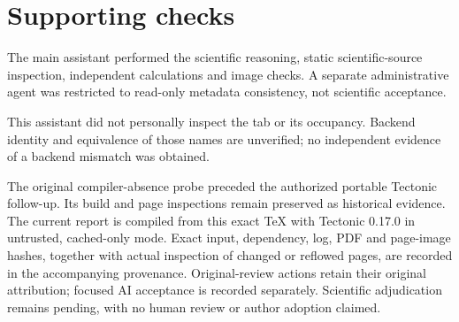 \documentclass[10pt]{article}
\begin{document}
\section*{Supporting checks}
The main assistant performed the scientific reasoning, static scientific-source inspection, independent calculations and image checks. A separate administrative agent was restricted to read-only metadata consistency, not scientific acceptance.\par
This assistant did not personally inspect the tab or its occupancy. Backend identity and equivalence of those names are unverified; no independent evidence of a backend mismatch was obtained.\par
The original compiler-absence probe preceded the authorized portable Tectonic follow-up. Its build and page inspections remain preserved as historical evidence. The current report is compiled from this exact TeX with Tectonic 0.17.0 in untrusted, cached-only mode. Exact input, dependency, log, PDF and page-image hashes, together with actual inspection of changed or reflowed pages, are recorded in the accompanying provenance. Original-review actions retain their original attribution; focused AI acceptance is recorded separately. Scientific adjudication remains pending, with no human review or author adoption claimed.\par
\end{document}
